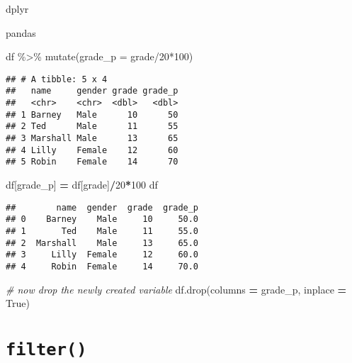 \documentclass[
]{book}
\newenvironment{Shaded}{\begin{snugshade}}{\end{snugshade}}
\newcommand{\AttributeTok}[1]{\textcolor[rgb]{0.77,0.63,0.00}{#1}}
\newcommand{\CommentTok}[1]{\textcolor[rgb]{0.56,0.35,0.01}{\textit{#1}}}
\newcommand{\DecValTok}[1]{\textcolor[rgb]{0.00,0.00,0.81}{#1}}
\newcommand{\FunctionTok}[1]{\textcolor[rgb]{0.00,0.00,0.00}{#1}}
\newcommand{\NormalTok}[1]{#1}
\newcommand{\OperatorTok}[1]{\textcolor[rgb]{0.81,0.36,0.00}{\textbf{#1}}}
\newcommand{\SpecialCharTok}[1]{\textcolor[rgb]{0.00,0.00,0.00}{#1}}
\newcommand{\StringTok}[1]{\textcolor[rgb]{0.31,0.60,0.02}{#1}}
\newcommand{\VariableTok}[1]{\textcolor[rgb]{0.00,0.00,0.00}{#1}}
\begin{document}
dplyr

pandas

\begin{Shaded}
\begin{Highlighting}[]
\NormalTok{df }\SpecialCharTok{\%\textgreater{}\%} 
  \FunctionTok{mutate}\NormalTok{(}\AttributeTok{grade\_p =}\NormalTok{ grade}\SpecialCharTok{/}\DecValTok{20}\SpecialCharTok{*}\DecValTok{100}\NormalTok{)}
\end{Highlighting}
\end{Shaded}

\begin{verbatim}
## # A tibble: 5 x 4
##   name     gender grade grade_p
##   <chr>    <chr>  <dbl>   <dbl>
## 1 Barney   Male      10      50
## 2 Ted      Male      11      55
## 3 Marshall Male      13      65
## 4 Lilly    Female    12      60
## 5 Robin    Female    14      70
\end{verbatim}

\begin{Shaded}
\begin{Highlighting}[]
\NormalTok{df[}\StringTok{\textquotesingle{}grade\_p\textquotesingle{}}\NormalTok{] }\OperatorTok{=}\NormalTok{ df[}\StringTok{\textquotesingle{}grade\textquotesingle{}}\NormalTok{]}\OperatorTok{/}\DecValTok{20}\OperatorTok{*}\DecValTok{100}
\NormalTok{df}
\end{Highlighting}
\end{Shaded}

\begin{verbatim}
##        name  gender  grade  grade_p
## 0    Barney    Male     10     50.0
## 1       Ted    Male     11     55.0
## 2  Marshall    Male     13     65.0
## 3     Lilly  Female     12     60.0
## 4     Robin  Female     14     70.0
\end{verbatim}

\begin{Shaded}
\begin{Highlighting}[]
\CommentTok{\# now drop the newly created variable}
\NormalTok{df.drop(columns }\OperatorTok{=} \StringTok{\textquotesingle{}grade\_p\textquotesingle{}}\NormalTok{, inplace }\OperatorTok{=} \VariableTok{True}\NormalTok{)}
\end{Highlighting}
\end{Shaded}

\hypertarget{filter}{%
\section{\texorpdfstring{\texttt{filter()}}{filter()}}\label{filter}}
\end{document}
